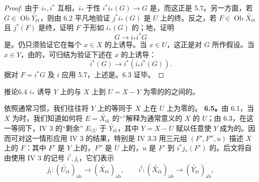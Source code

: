 \begin{proof}
由于 $i_*,i^*$ 互相，$i_*$ 于性 $i^*i_*(G)\to G$ 是，而这正是 5.7。另一方面，若 $G\in\operatorname{Ob}\widetilde{Y_{\text{ét}}}$，则由 6.2 平凡地验证 $j^*i_*(G)$ 是 $U$ 上的终。反之，若 $F\in\operatorname{Ob}\widetilde{X_{\text{ét}}}$ 且 $j^*(F)$ 是终，证明 $F$ 于形如 $i_*(G)$ 的；地，证明
\[G\longrightarrow i_*i^*G\]
是。仍只须验证它在每个 $x\in X$ 的上诱导。当 $x\in U$，这正是对 $G$ 所作假设。当 $x\in Y$，由的，可归结为验证下述在 $x$ 的上诱导：
\[i^*(G)\longrightarrow i^*(i_*i^*(G)).\]
据对 $F=i^*G$ 及 $i$ 应用 5.7，上述是。6.3 证毕。
\end{proof}
\begin{SGAresult}{推论}{6.4}
 $i_*$ 诱导 $Y$ 上的与 $X$ 上到 $U=X-Y$ 为零的的之间的。
\end{SGAresult}
依照通常习惯，我们往往将 $Y$ 上的等同于 $X$ 上在 $U$ 上为零的。
\textbf{6.5。}由 6.1，当 $X$ 为时，我们知道如何将 $E=\widetilde{X_{\text{ét}}}$ 的“”解释为通常意义的 $X$ 的 $U$；由 6.3，在这一等同下，IV 3 的“剩余” $E_{\complement U}$ 于 $\widetilde{Y_{\text{ét}}}$，其中 $Y=X-U$ 赋以任意使 $Y$ 成为的。因而可对这一情形应用 IV 3 的结果，特别是 IV 3.3 用三元组 $(F',F'',u)$ 描述 $X$ 上的 $F$：其中 $F'$ 是 $Y$ 上的，$F''$ 是 $U$ 上的，$u$ 是 $F'$ 到 $i^*j_*(F')$ 的。后文将自由使用 IV 3 的记号 $i^!,j_!$，它们表示
\[j_!:(\widetilde{U_{\text{ét}}})_{\mathrm{ab}}\longrightarrow(\widetilde{X_{\text{ét}}})_{\mathrm{ab}},\qquad
 i^!:(\widetilde{X_{\text{ét}}})_{\mathrm{ab}}\longrightarrow(\widetilde{Y_{\text{ét}}})_{\mathrm{ab}},\]
